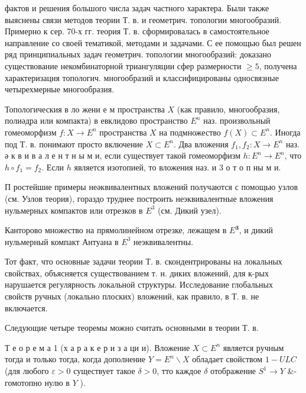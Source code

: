 \documentclass[10pt]{article}
\begin{document}
фактов и решения большого числа задач частного характера. Были также выяснены связи методов теории Т. в. и геометрич. топологии многообразий. Примерно к сер. 70-х гг. теория Т. в. сформировалась в самостоятельное направление со своей тематикой, методами и задачами. С ее помощью был решен ряд принципиальных задач геометрич. топологии многообразий: доказано существование некомбинаторной триангуляции сфер размерности $\geqslant 5$, получена характеризация топологич. многообразий и классифицированы односвязные четырехмерные многообразия.



Топологическия в ло жени е м пространства $X$ (как правило, многообразия, полиәдра или компакта) в евклидово пространство $E^{n}$ наз. произвольный гомеоморфизм $f: X \rightarrow E^{n}$ пространства $X$ на подмножество $f(X) \subset E^{n}$. Иногда под Т. в. понимают просто включение $X \subset E^{n}$. Два вложения $f_{1}, f_{2}: X \rightarrow E^{n}$ наз. ә к в и в а л е н т н ы м и, если существует такой гомеоморфизм $h: E^{n} \rightarrow E^{n}$, что $h \circ f_{1}=f_{2}$. Если $h$ является изотопией, то вложения наз. и 3 о т о п ны м и.



П ростейшие примеры неәквивалентных вложений получаются с помощью узлов (см. Узлов теория), гораздо труднее построить неэквивалентные вложения нульмерных компактов или отрезков в $E^{3}$ (см. Дикий узел).



Канторово множество на прямолинейном отрезке, лежащем в $E^{\mathbf{3}}$, и дикий нульмерный компакт Антуана в $E^{3}$ неэквивалентны.



Тот факт, что основные задачи теории Т. в. скондентрированы на локальных свойствах, объясняется существованием т. н. диких вложений, для к-рых нарушается регулярность локальной структуры. Исследование глобальных свойств ручных (локально плоских) вложений, как правило, в Т. в. не включается.



Следующие четыре теоремы можно считать основными в теории Т. в.



Т е о р е м а 1 (х а р а к е р и з а ци и). Вложение $X \subset E^{n}$ является ручным тогда и только тогда, когда дополнение $Y=E^{n} \backslash X$ обладает свойством $1-U L C$ (для любого $\varepsilon>0$ существует такое $\delta>0$, тто каждое $\delta$ отображение $S^{1} \rightarrow Y$ \&-гомотопно нулю в $Y$ ).
\end{document}
